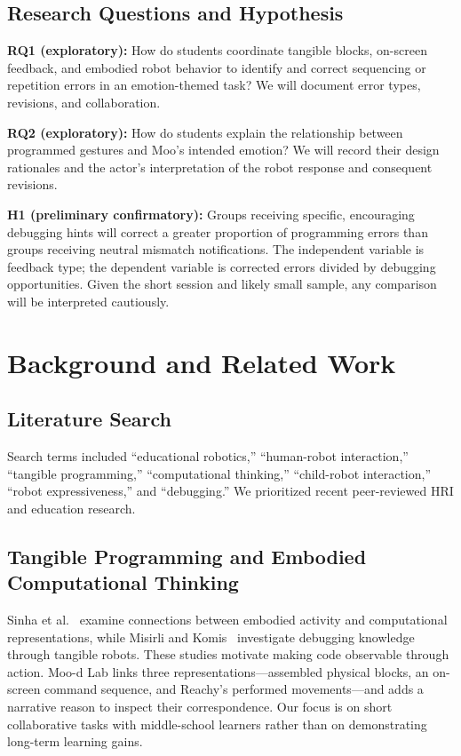 \documentclass[conference,12pt,letterpaper]{IEEEtran}
\begin{document}
\subsection{Research Questions and Hypothesis}
\textbf{RQ1 (exploratory):} How do students coordinate tangible blocks, on-screen feedback, and embodied robot behavior to identify and correct sequencing or repetition errors in an emotion-themed task? We will document error types, revisions, and collaboration.

\textbf{RQ2 (exploratory):} How do students explain the relationship between programmed gestures and Moo's intended emotion? We will record their design rationales and the actor's interpretation of the robot response and consequent revisions.

\textbf{H1 (preliminary confirmatory):} Groups receiving specific, encouraging debugging hints will correct a greater proportion of programming errors than groups receiving neutral mismatch notifications. The independent variable is feedback type; the dependent variable is corrected errors divided by debugging opportunities. Given the short session and likely small sample, any comparison will be interpreted cautiously.

\section{Background and Related Work}
\subsection{Literature Search}
Search terms included ``educational robotics,'' ``human-robot interaction,'' ``tangible programming,'' ``computational thinking,'' ``child-robot interaction,'' ``robot expressiveness,'' and ``debugging.'' We prioritized recent peer-reviewed HRI and education research.

\subsection{Tangible Programming and Embodied Computational Thinking}
Sinha et al.~\cite{paper1} examine connections between embodied activity and computational representations, while Misirli and Komis~\cite{paper4} investigate debugging knowledge through tangible robots. These studies motivate making code observable through action. Moo-d Lab links three representations---assembled physical blocks, an on-screen command sequence, and Reachy's performed movements---and adds a narrative reason to inspect their correspondence. Our focus is on short collaborative tasks with middle-school learners rather than on demonstrating long-term learning gains.
\end{document}
